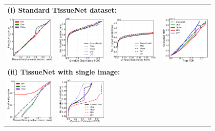 \documentclass{article}
\begin{document}
\begin{figure}
	\centering
	\begin{tabular}{cccc}
		\multicolumn{4}{l}{\bf (i) Standard TissueNet dataset:}\\		
		\includegraphics[width=0.225\linewidth, height=0.225\linewidth]{img/cnn_QQ_cells_segment.png} &
		\includegraphics[width=0.225\linewidth, height=0.225\linewidth]{img/cnn_cells_segment_fdr_control.png} & 
		\includegraphics[width=0.225\linewidth, height=0.225\linewidth]{img/cnn_cells_segment_fdr_control_loc.png} & 
		\includegraphics[width=0.225\linewidth, height=0.225\linewidth]{img/cnn_FDPscat_cells_segment.png}\\	
		\multicolumn{4}{l}{\bf (ii) TissueNet with single image:}\\		
		\includegraphics[width=0.225\linewidth, height=0.225\linewidth]{img/cnn_QQ_cells_balanced.png} &
		\includegraphics[width=0.225\linewidth, height=0.225\linewidth]{img/cnn_cells_balanced_fdr_control.png} & 

\end{tabular}
\end{figure}
\end{document}
